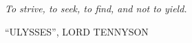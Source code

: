 \clearpage
\null\vfill
\settowidth{}
\begin{center}
\parbox{\longest}{
\raggedright{\Large\itshape
To strive, to seek, to find, and not to yield. \par\bigskip
}
\raggedleft\large\MakeUppercase{``Ulysses'', Lord Tennyson}\par
}
\end{center}
\vfill\vfill
\clearpage
